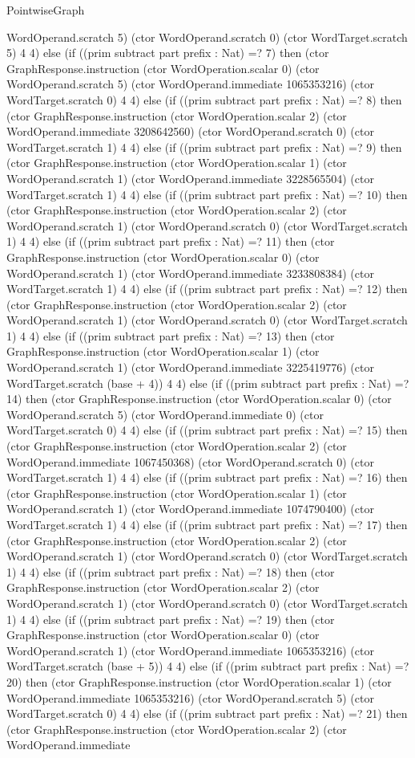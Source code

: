 \begin{lexlean}{PointwiseGraph}
\begin{semanticmodule}
{WordOperand.scratch 5) (ctor WordOperand.scratch 0) (ctor WordTarget.scratch 5) 4 4) else (if ((prim subtract part prefix : Nat) =? 7) then (ctor GraphResponse.instruction (ctor WordOperation.scalar 0) (ctor WordOperand.scratch 5) (ctor WordOperand.immediate 1065353216) (ctor WordTarget.scratch 0) 4 4) else (if ((prim subtract part prefix : Nat) =? 8) then (ctor GraphResponse.instruction (ctor WordOperation.scalar 2) (ctor WordOperand.immediate 3208642560) (ctor WordOperand.scratch 0) (ctor WordTarget.scratch 1) 4 4) else (if ((prim subtract part prefix : Nat) =? 9) then (ctor GraphResponse.instruction (ctor WordOperation.scalar 1) (ctor WordOperand.scratch 1) (ctor WordOperand.immediate 3228565504) (ctor WordTarget.scratch 1) 4 4) else (if ((prim subtract part prefix : Nat) =? 10) then (ctor GraphResponse.instruction (ctor WordOperation.scalar 2) (ctor WordOperand.scratch 1) (ctor WordOperand.scratch 0) (ctor WordTarget.scratch 1) 4 4) else (if ((prim subtract part prefix : Nat) =? 11) then (ctor GraphResponse.instruction (ctor WordOperation.scalar 0) (ctor WordOperand.scratch 1) (ctor WordOperand.immediate 3233808384) (ctor WordTarget.scratch 1) 4 4) else (if ((prim subtract part prefix : Nat) =? 12) then (ctor GraphResponse.instruction (ctor WordOperation.scalar 2) (ctor WordOperand.scratch 1) (ctor WordOperand.scratch 0) (ctor WordTarget.scratch 1) 4 4) else (if ((prim subtract part prefix : Nat) =? 13) then (ctor GraphResponse.instruction (ctor WordOperation.scalar 1) (ctor WordOperand.scratch 1) (ctor WordOperand.immediate 3225419776) (ctor WordTarget.scratch (base + 4)) 4 4) else (if ((prim subtract part prefix : Nat) =? 14) then (ctor GraphResponse.instruction (ctor WordOperation.scalar 0) (ctor WordOperand.scratch 5) (ctor WordOperand.immediate 0) (ctor WordTarget.scratch 0) 4 4) else (if ((prim subtract part prefix : Nat) =? 15) then (ctor GraphResponse.instruction (ctor WordOperation.scalar 2) (ctor WordOperand.immediate 1067450368) (ctor WordOperand.scratch 0) (ctor WordTarget.scratch 1) 4 4) else (if ((prim subtract part prefix : Nat) =? 16) then (ctor GraphResponse.instruction (ctor WordOperation.scalar 1) (ctor WordOperand.scratch 1) (ctor WordOperand.immediate 1074790400) (ctor WordTarget.scratch 1) 4 4) else (if ((prim subtract part prefix : Nat) =? 17) then (ctor GraphResponse.instruction (ctor WordOperation.scalar 2) (ctor WordOperand.scratch 1) (ctor WordOperand.scratch 0) (ctor WordTarget.scratch 1) 4 4) else (if ((prim subtract part prefix : Nat) =? 18) then (ctor GraphResponse.instruction (ctor WordOperation.scalar 2) (ctor WordOperand.scratch 1) (ctor WordOperand.scratch 0) (ctor WordTarget.scratch 1) 4 4) else (if ((prim subtract part prefix : Nat) =? 19) then (ctor GraphResponse.instruction (ctor WordOperation.scalar 0) (ctor WordOperand.scratch 1) (ctor WordOperand.immediate 1065353216) (ctor WordTarget.scratch (base + 5)) 4 4) else (if ((prim subtract part prefix : Nat) =? 20) then (ctor GraphResponse.instruction (ctor WordOperation.scalar 1) (ctor WordOperand.immediate 1065353216) (ctor WordOperand.scratch 5) (ctor WordTarget.scratch 0) 4 4) else (if ((prim subtract part prefix : Nat) =? 21) then (ctor GraphResponse.instruction (ctor WordOperation.scalar 2) (ctor WordOperand.immediate }
\end{semanticmodule}
\end{lexlean}
